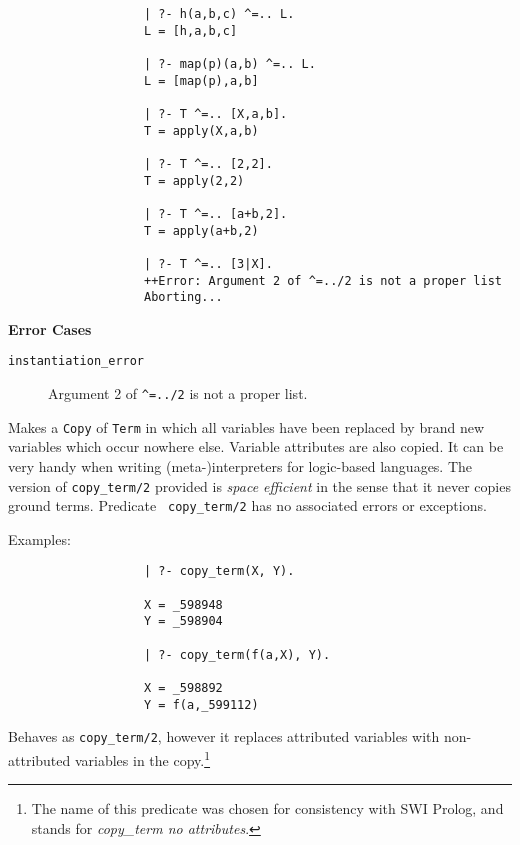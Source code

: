 \begin{description}
\begin{itemize}
{\begin{verbatim}
                   | ?- h(a,b,c) ^=.. L.
                   L = [h,a,b,c]

                   | ?- map(p)(a,b) ^=.. L.
                   L = [map(p),a,b]

                   | ?- T ^=.. [X,a,b].
                   T = apply(X,a,b)

                   | ?- T ^=.. [2,2].
                   T = apply(2,2)

                   | ?- T ^=.. [a+b,2].
                   T = apply(a+b,2)

                   | ?- T ^=.. [3|X].
                   ++Error: Argument 2 of ^=../2 is not a proper list
                   Aborting...
     \end{verbatim}}

{\bf Error Cases}
     \begin{description}
     \item[{\tt instantiation\_error}]
	Argument 2 of {\tt \verb|^|=../2} is not a proper list.
     \end{description}

 Makes a {\tt Copy} of
        {\tt Term} in which all variables have been replaced by brand
        new variables which occur nowhere else.  Variable attributes
        are also copied.  It can be very handy when writing
        (meta-)interpreters for logic-based languages.  The version of
        {\tt copy\_term/2} provided is {\em space efficient} in the
        sense that it never copies ground terms.  Predicate {\tt
          copy\_term/2} has no associated errors or exceptions.

    Examples:
    {\footnotesize
     \begin{verbatim}
                   | ?- copy_term(X, Y).

                   X = _598948
                   Y = _598904

                   | ?- copy_term(f(a,X), Y).

                   X = _598892
                   Y = f(a,_599112)
     \end{verbatim}}

%
Behaves as {\tt copy\_term/2}, however it replaces attributed
variables with non-attributed variables in the copy.\footnote{The name
  of this predicate was chosen for consistency with SWI Prolog, and
  stands for {\em copy\_term no attributes}.}


\end{itemize}
\end{description}
